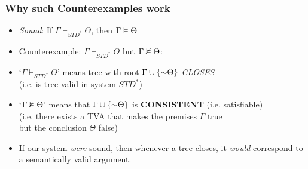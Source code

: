 \begin{frame}
\frametitle{Why such Counterexamples work}

\begin{itemize}[<+->]

\item \emph{Sound}: If $\Gamma \vdash_{STD^{\ast}} \Theta$, then $\Gamma \vDash \Theta$

\item Counterexample: $\Gamma \vdash_{STD^{\ast}} \Theta$ but $\Gamma \nvDash \Theta$:


\bi

\item `$\Gamma \vdash_{STD^{\ast}} \Theta$' means tree with root $\Gamma \cup \{\enot \Theta \}$ \emph{CLOSES} \\ (i.e. is tree-valid in system $STD^{\ast}$)

\item `$\Gamma \nvDash \Theta$' means that $\Gamma \cup \{\enot \Theta \}$ is \textbf{\textcolor{OGlyallpink}{CONSISTENT}} (i.e. satisfiable) \\ (i.e. there exists a TVA that makes the premises $\Gamma$ true \\ but the conclusion $\Theta$ false) 

\ei 

\bigskip

\item If our system \textit{were} sound, then whenever a tree closes, it \textit{would} correspond to a semantically valid argument. 

\end{itemize}
\end{frame}


